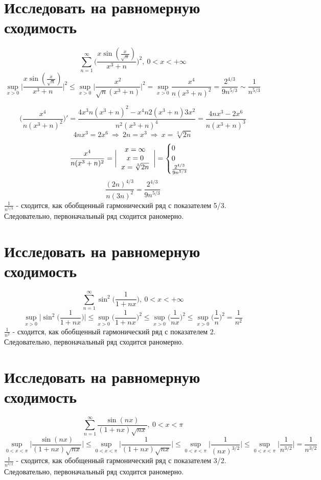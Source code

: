 \documentclass{article}
\begin{document}
\section{Исследовать на равномерную сходимость}
\[
    \sum\limits_{n=1}^{\infty} \bigg( \frac{x\sin(\frac{x}{\sqrt{n}})}{x^3+n} \bigg)^2, \ 0 < x < +\infty 
\]
\[
    \sup\limits_{x>0}\bigg| \frac{x\sin(\frac{x}{\sqrt{n}})}{x^3+n} \bigg|^2 \le \sup\limits_{x>0} \bigg| \frac{x^2}{\sqrt{n}(x^3 + n)} \bigg|^2 = \sup\limits_{x>0} \frac{x^4}{n(x^3 + n)^2}  = \frac{2^{4/3}}{9n^{5/3}} \sim \frac{1}{n^{5/3}}
\]


\[
    \bigg( \frac{x^4}{n(x^3 + n)^2} \bigg)' = \frac{4x^3n(x^3 + n)^2 - x^4n2(x^3 + n)3x^2}{n^2(x^3 + n)^4} = \frac{4nx^3 - 2x^6}{n(x^3 + n)^3}
\]
\[
    4nx^3 = 2x^6 \ \Rightarrow \ 2n = x^3 \ \Rightarrow \ x = \sqrt[3]{2n}
\]
\[
     \frac{x^4}{n(x^3 + n)^2} = \bigg| \begin{tabular}{ c }
        $x=\infty$  \\ 
        $x=0$  \\  
        $x= \sqrt[3]{2n}$     
       \end{tabular} \bigg| = \begin{cases}
        0 \\
        0 \\
         \frac{2^{4/3}}{9n^{5/3}}
       \end{cases}
\]
\[
     \frac{(2n)^{4/3}}{n(3n)^2} = \frac{2^{4/3}}{9n^{5/3}}
\]
$\frac{1}{n^{5/3}}$ - сходится, как обобщенный гармонический ряд с показателем 5/3. Следовательно, первоначальный ряд сходится раномерно.




\section{Исследовать на равномерную сходимость}
\[
    \sum\limits_{n=1}^\infty\sin^2\biggl( \frac{1}{1+nx} \bigg), \ 0 < x < +\infty
\]
\[
    \sup\limits_{x>0} \bigg| \sin^2\biggl( \frac{1}{1+nx} \biggr) \bigg| \le \sup\limits_{x > 0} \bigg( \frac{1}{1+nx} \bigg)^2 \le \sup\limits_{x > 0}\bigg( \frac{1}{nx} \bigg)^2 \le \sup\limits_{x > 0}\bigg( \frac{1}{n} \bigg)^2  = \frac{1}{n^2}
\]
$\frac{1}{n^{2}}$ - сходится, как обобщенный гармонический ряд с показателем 2. Следовательно, первоначальный ряд сходится раномерно.
\section{Исследовать на равномерную сходимость}
\[
    \sum\limits_{n=1}^\infty\frac{\sin (nx)}{(1+nx)\sqrt{nx}}, \  0 < x < \pi
\]
\[
    \sup\limits_{0<x<\pi} \bigg| \frac{\sin(nx)}{(1+nx)\sqrt{nx}} \bigg| \le \sup\limits_{0<x<\pi} \bigg| \frac{1}{(1+nx) \sqrt{nx}} \bigg| \le \sup\limits_{0<x<\pi} \bigg| \frac{1}{(nx)^{3/2}} \bigg| \le \sup\limits_{0<x<\pi} \bigg| \frac{1}{n^{3/2}} \bigg| = \frac{1}{n^{3/2}}
\]
$\frac{1}{n^{3/2}}$ - сходится, как обобщенный гармонический ряд с показателем 3/2. Следовательно, первоначальный ряд сходится раномерно.
\end{document}
